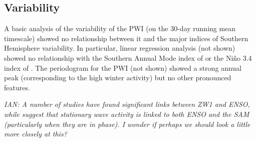 \subsection{Variability}

A basic analysis of the variability of the PWI (on the 30-day running mean timescale) showed no relationship between it and the major indices of Southern Hemisphere variability. In particular, linear regression analysis (not shown) showed no relationship with the Southern Annual Mode index of \citet{Marshall2003} or the Ni\~{n}o 3.4 index of \citet{Trenberth2001}. The periodogram for the PWI (not shown) showed a strong annual peak (corresponding to the high winter activity) but no other pronounced features.

\textit{IAN: A number of studies \citep[e.g.][]{Trenberth1980,Raphael2003,Hobbs2007} have found significant links between ZW1 and ENSO, while \citet{Pezza2012} suggest that stationary wave activity is linked to both ENSO and the SAM (particularly when they are in phase). I wonder if perhaps we should look a little more closely at this?}